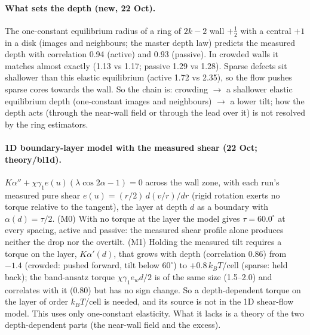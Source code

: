 \documentclass[11pt,a4paper]{article}
\newcommand{\half}{\tfrac12}
\newcommand{\kT}{k_BT}
\begin{document}
\paragraph{What sets the depth (new, 22 Oct).} The one-constant equilibrium radius of a ring of $2k-2$ wall $+\half$ with a central $+1$ in a disk
(images and neighbours; the master depth law) predicts the measured depth with correlation 0.94 (active) and 0.93 (passive). In crowded walls it
matches almost exactly (1.13 vs 1.17; passive 1.29 vs 1.28). Sparse defects sit shallower than this elastic equilibrium (active 1.72 vs 2.35), so
the flow pushes sparse cores towards the wall. So the chain is: crowding $\to$ a shallower elastic equilibrium depth (one-constant images and
neighbours) $\to$ a lower tilt; how the depth acts (through the near-wall field or through the lead over it) is not resolved by the ring estimators.

\paragraph{1D boundary-layer model with the measured shear (22 Oct; theory/bl1d).} $K\alpha''+\chi\gamma_1e(u)(\lambda\cos2\alpha-1)=0$ across the wall zone, with
each run's measured pure shear $e(u)=(r/2)\,d(v/r)/dr$ (rigid rotation exerts no torque relative to the tangent), the layer at depth $d$ as a boundary with
$\alpha(d)=\tau/2$. (M0) With no torque at the layer the model gives $\tau=60.0^\circ$ at every spacing, active and passive: the measured shear profile alone
produces neither the drop nor the overtilt. (M1) Holding the measured tilt requires a torque on the layer, $K\alpha'(d)$, that grows with depth (correlation
0.86) from $-1.4$ (crowded: pushed forward, tilt below $60^\circ$) to $+0.8\,\kT$/cell (sparse: held back); the band-ansatz torque $\chi\gamma_1e_wd/2$ is of the same size
(1.5--2.0) and correlates with it (0.80) but has no sign change. So a depth-dependent torque on the layer of order $\kT$/cell is needed, and its source is
not in the 1D shear-flow model. This uses only
one-constant elasticity. What it lacks is a theory of the two depth-dependent parts (the near-wall field and the excess).
\end{document}
